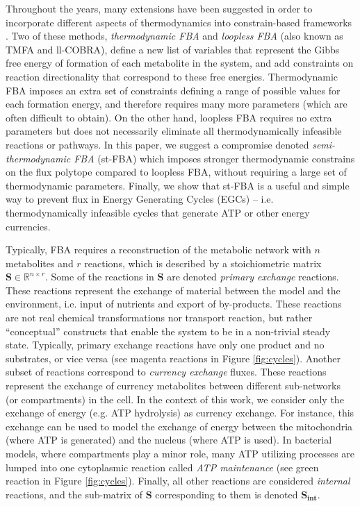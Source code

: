 \documentclass[twocolumn]{article}
\newcommand{\Sint}{\mathbf{S_{int}}}
\begin{document}
Throughout the years, many extensions have been suggested in order to incorporate different aspects of thermodynamics into constrain-based frameworks \cite{Beard2002-xt, Warren2007-wm, Henry2007-xp, Schellenberger2011-bq, Price2006-ua, Bordel2010-pl, Fleming2010-py, Holzhutter2004-qj, Fleming2009-um, Kummel2006-qn, Henry2006-nt, Hoppe2007-sw, De_Martino2012-cj, Tepper2013-gd, Nolan2006-eg, Nagrath2007-bn, Boghigian2010-vz}.
Two of these methods, \textit{thermodynamic FBA} \cite{Henry2007-xp} and \textit{loopless FBA} \cite{Schellenberger2011-bq} (also known as TMFA and ll-COBRA), define a new list of variables that represent the Gibbs free energy of formation of each metabolite in the system, and add constraints on reaction directionality that correspond to these free energies. Thermodynamic FBA imposes an extra set of constraints defining a range of possible values for each formation energy, and therefore requires many more parameters (which are often difficult to obtain). On the other hand, loopless FBA requires no extra parameters but does not necessarily eliminate all thermodynamically infeasible reactions or pathways. In this paper, we suggest a compromise denoted \textit{semi-thermodynamic FBA} (st-FBA) which imposes stronger thermodynamic constrains on the flux polytope compared to loopless FBA, without requiring a large set of thermodynamic parameters. Finally, we show that st-FBA is a useful and simple way to prevent flux in Energy Generating Cycles (EGCs) -- i.e. thermodynamically infeasible cycles that generate ATP or other energy currencies.

Typically, FBA requires a reconstruction of the metabolic network with $n$ metabolites and $r$ reactions, which is described by a stoichiometric matrix $\mathbf{S} \in \mathbb{R}^{n \times r}$. Some of the reactions in $\mathbf{S}$ are denoted \emph{primary exchange} reactions. These reactions represent the exchange of material between the model and the environment, i.e. input of nutrients and export of by-products. These reactions are not real chemical transformations nor transport reaction, but rather ``conceptual'' constructs that enable the system to be in a non-trivial steady state. Typically, primary exchange reactions have only one product and no substrates, or vice versa (see magenta reactions in Figure \ref{fig:cycles}). Another subset of reactions correspond to \emph{currency exchange} fluxes. These reactions represent the exchange of currency metabolites between different sub-networks (or compartments) in the cell. In the context of this work, we consider only the exchange of energy (e.g. ATP hydrolysis) as currency exchange. For instance, this exchange can be used to model the exchange of energy between the mitochondria (where ATP is generated) and the nucleus (where ATP is used). In bacterial models, where compartments play a minor role, many ATP utilizing processes are lumped into one cytoplasmic reaction called \emph{ATP maintenance} (see green reaction in Figure \ref{fig:cycles}). Finally, all other reactions are considered \emph{internal} reactions, and the sub-matrix of $\mathbf{S}$ corresponding to them is denoted $\Sint$.
\end{document}
